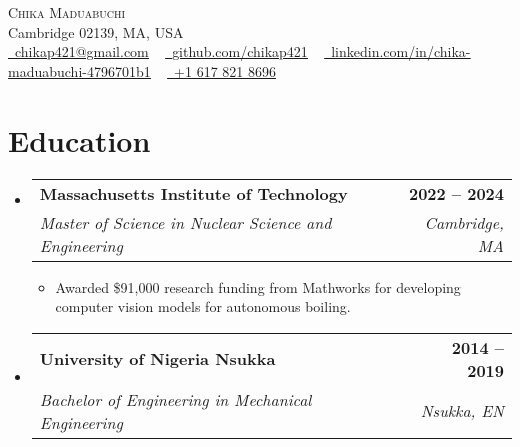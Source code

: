 \documentclass[letterpaper,11pt]{article}
\makeatletter
\newcommand{\resumeItem}[1]{
  \item\small{
    {#1 \vspace{-2pt}}
  }
}
\newcommand{\resumeSubheading}[4]{
  \vspace{-2pt}\item
    \begin{tabular*}{1.0\textwidth}[t]{l@{\extracolsep{\fill}}r}
      \textbf{#1} & \textbf{\small #2} \\
      \textit{\small#3} & \textit{\small #4} \\
    \end{tabular*}\vspace{-7pt}
}
\newcommand{\resumeSubHeadingListStart}{\begin{itemize}[leftmargin=0.0in, label={}]}
\newcommand{\resumeSubHeadingListEnd}{\end{itemize}}
\newcommand{\resumeItemListStart}{\begin{itemize}}
\newcommand{\resumeItemListEnd}{\end{itemize}\vspace{-5pt}}
\makeatother
\begin{document}

\begin{center}
    {\Huge \scshape Chika Maduabuchi} \\ \vspace{1pt}
    Cambridge 02139, MA, USA \\ \vspace{1pt}
    \small \href{mailto:chikap421@gmail.com}{\raisebox{-0.2\height}\faEnvelope\  \underline{chikap421@gmail.com}} ~ 
    \href{https://github.com/chikap421}{\raisebox{-0.2\height}\faGithub\ \underline{github.com/chikap421}} ~
    \href{https://www.linkedin.com/in/chika-maduabuchi-4796701b1/}{\raisebox{-0.2\height}\faLinkedin\ \underline{linkedin.com/in/chika-maduabuchi-4796701b1}} ~
    \href{tel:+16178218696}{\raisebox{-0.2\height}\faPhone\ +1 617 821 8696}
    \vspace{-8pt}
\end{center}



\section{Education}
  \resumeSubHeadingListStart
    \resumeSubheading
      {Massachusetts Institute of Technology}{2022 -- 2024}
      {Master of Science in Nuclear Science and Engineering}{Cambridge, MA}
      \resumeItemListStart
        \resumeItem{Awarded \$91,000 research funding from Mathworks for developing computer vision models for autonomous boiling.}
      \resumeItemListEnd
    \resumeSubheading
      {University of Nigeria Nsukka}{2014 -- 2019}
      {Bachelor of Engineering in Mechanical Engineering}{Nsukka, EN}
  \resumeSubHeadingListEnd

\end{document}
